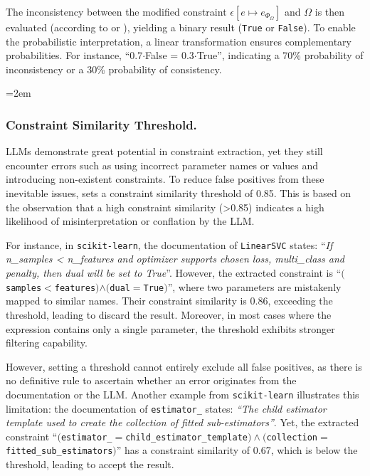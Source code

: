 The inconsistency between the modified constraint $\epsilon[e \mapsto e_{\Phi_\Omega}]$ and
$\Omega$ is then evaluated (according to  or
), yielding a binary result (\texttt{True} or \texttt{False}).
To enable the probabilistic interpretation, a linear transformation
ensures complementary probabilities. For instance, ``0.7$\cdot$False = 0.3$\cdot$True'', indicating
a 70\% probability of inconsistency or a 30\% probability of consistency.


\begingroup
\emergencystretch=2em
\subsubsection{Constraint Similarity Threshold.} LLMs demonstrate great potential in constraint extraction, yet they still encounter errors such as using incorrect parameter names or values and introducing non-existent constraints. To reduce false positives from these inevitable issues, \toolchecker sets a constraint similarity threshold of 0.85. This is based on the observation that a high constraint similarity (>0.85) indicates a high likelihood of misinterpretation or conflation by the LLM.

For instance, in \texttt{scikit-learn}, the documentation of \texttt{LinearSVC} states: ``\emph{If n\_samples < n\_features and optimizer supports chosen loss, multi\_class and penalty, then dual will be set to True}''. However, the extracted constraint is ``\texttt{$($samples$<$features$)$$\wedge$\allowbreak$($dual$=$True$)$}'', where two parameters are mistakenly mapped to similar names. Their constraint similarity is 0.86, exceeding the threshold, leading \toolchecker to discard the result. Moreover, in most cases where the expression contains only a single parameter, the threshold exhibits stronger filtering capability.

However, setting a threshold cannot entirely exclude all false positives, as there is no definitive rule to ascertain whether an error originates from the documentation or the LLM. Another example from \texttt{scikit-learn} illustrates this limitation: the documentation of \texttt{estimator\_} states: \emph{``The child estimator template used to create the collection of fitted sub-estimators''}. Yet, the extracted constraint ``\texttt{$($estimator\_$=$child\_estimator\_template$)$\allowbreak${}\wedge{}$\allowbreak$($collection$=$fitted\_sub\_estimators$)$}'' has a constraint similarity of 0.67, which is below the threshold, leading \toolchecker to accept the result.
\par
\endgroup
